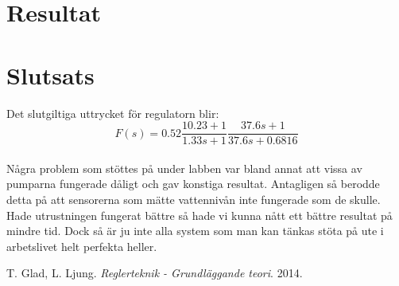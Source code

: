 \documentclass[a4paper]{article}
\begin{document}
\section{Resultat}



\section{Slutsats}

Det slutgiltiga uttrycket för regulatorn blir:
\\
\begin{equation*}
  F(s)=0.52\frac{10.23+1}{1.33s+1} \frac{37.6s+1}{37.6s+0.6816}
\end{equation*}
\\

Några problem som stöttes på under labben var bland annat att vissa av pumparna fungerade dåligt och gav konstiga resultat.
Antagligen så berodde detta på att sensorerna som mätte vattennivån inte fungerade som de skulle.
Hade utrustningen fungerat bättre så hade vi kunna nått ett bättre resultat på mindre tid.
Dock så är ju inte alla system som man kan tänkas stöta på ute i arbetslivet helt perfekta heller. 

\begin{thebibliography}{9}
    T. Glad, L. Ljung. 
    \emph{Reglerteknik - Grundläggande teori}.
    2014.
\end{thebibliography}
\end{document}
